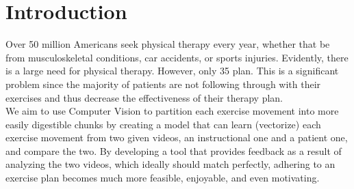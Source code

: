 \section{Introduction}
\label{sec:intro}

\indent Over 50 million Americans seek physical therapy every year, whether that be from 
musculoskeletal conditions, car accidents, or sports injuries. Evidently, there is a large
need for physical therapy\cite{Authors14i}. However, only 35%
plan\cite{Authors14h}. This is a significant problem since the majority of patients are not following 
through with their exercises and thus decrease the effectiveness of their therapy plan.
\\
\indent We aim to use Computer Vision to partition each exercise movement into more easily digestible chunks 
by creating a model that can learn (vectorize) each exercise movement from two given videos, an instructional 
one and a patient one, and compare the two. By developing a tool that provides feedback as a result of analyzing 
the two videos, which ideally should match perfectly, adhering to an exercise plan 
becomes much more feasible, enjoyable, and even motivating.

